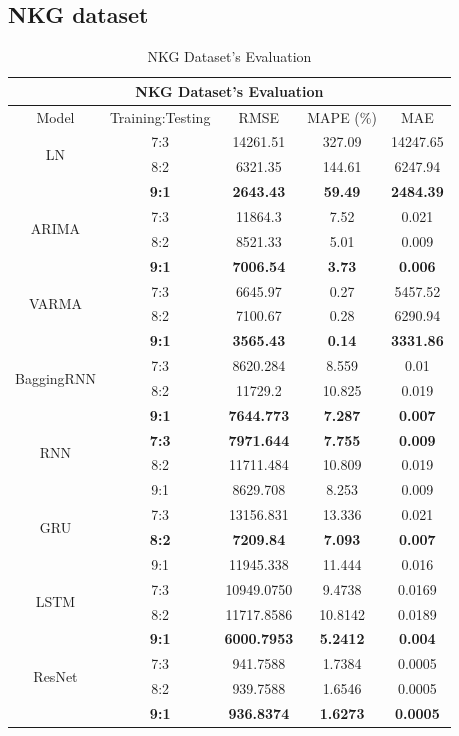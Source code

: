 \documentclass{ieeeojies}
\begin{document}
\subsection{NKG dataset} 
\begin{table}[H]
    \centering
    \begin{tabular}{|c|c|c|c|c|}
         \hline
         \multicolumn{5}{|c|}{\textbf{NKG Dataset's Evaluation}}\\
         \hline
         \centering Model & Training:Testing & RMSE & MAPE (\%) & MAE\\
         \hline
         \multirow{2}{*}{LN} & 7:3 & 14261.51 & 327.09 & 14247.65 \\ & 8:2 & 6321.35 & 144.61 & 6247.94 \\ & \textbf{9:1} & \textbf{2643.43} & \textbf{59.49} & \textbf{2484.39}\\
         \hline
         \multirow{2}{*}{ARIMA} & 7:3&11864.3&7.52&0.021\\ & 8:2&8521.33&5.01&0.009 \\ & \textbf{9:1} & \textbf{7006.54} & \textbf{3.73} & \textbf{0.006}\\
         \hline
         \multirow{2}{*}{VARMA} & 7:3	& 6645.97 &  0.27 & 5457.52 \\ & 8:2 & 7100.67 & 0.28 & 6290.94 \\ & \textbf{9:1} & \textbf{3565.43}  & \textbf{0.14} & \textbf{3331.86}\\
         \hline
         \multirow{2}{*}{BaggingRNN} & 7:3 &  8620.284 &  8.559 & 0.01 \\ & 8:2 &  11729.2 & 10.825 & 0.019 \\ & \textbf{9:1} & \textbf{7644.773}  & \textbf{7.287} & \textbf{0.007}\\
         \hline
         \multirow{2}{*}{RNN} & \textbf{7:3}	& \textbf{7971.644} & \textbf{7.755} & \textbf{0.009} \\ & 8:2 & 11711.484 & 10.809 & 0.019 \\ & 9:1 & 8629.708 & 8.253 & 0.009\\
         \hline
         \multirow{2}{*}{GRU} & 7:3 & 13156.831&13.336 & 0.021 \\ & \textbf{8:2} &	\textbf{7209.84} & \textbf{7.093} & \textbf{0.007} \\ & 9:1 &11945.338	&11.444&0.016\\
         \hline
         \multirow{2}{*}{LSTM} & 7:3 & 10949.0750 & 9.4738 & 0.0169 \\ & 8:2 & 11717.8586 &10.8142 & 0.0189 \\ & \textbf{9:1} &  	\textbf{6000.7953} &	\textbf{5.2412} & 	\textbf{0.004} \\
         \hline
         \multirow{2}{*}{ResNet} & 7:3 & 941.7588 &  1.7384 &  0.0005 \\ & 8:2 & 939.7588 &  1.6546 &  0.0005 \\ & \textbf{9:1} & \textbf{936.8374} & \textbf{1.6273} & \textbf{0.0005}\\
         \hline
    \end{tabular}
    \caption{NKG Dataset's Evaluation}
    \label{mbbresult}
\end{table}
\end{document}
